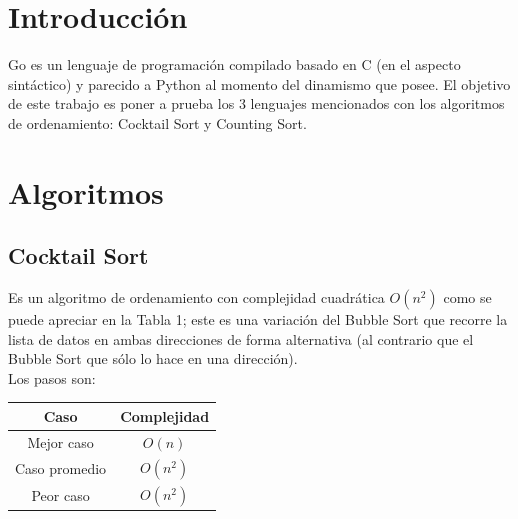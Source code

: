 \documentclass[https://www.overleaf.com/project/63761df255a8a9f4a15c3579
	letterpaper, %
	10pt, %
]{CSUniSchoolLabReport}
\begin{document}


\section{Introducción}

Go es un lenguaje de programación compilado basado en C (en el aspecto sintáctico) y parecido a Python al momento del dinamismo que posee. El objetivo de este trabajo es poner a prueba los 3 lenguajes mencionados con los algoritmos de ordenamiento: Cocktail Sort y Counting Sort.
 

\section{Algoritmos}

\subsection{Cocktail Sort}

Es un algoritmo de ordenamiento con complejidad cuadrática \(O(n^2)\) como se puede apreciar en la Tabla 1; este es una variación del Bubble Sort que recorre la lista de datos en ambas direcciones de forma alternativa (al contrario que el Bubble Sort que sólo lo hace en una dirección). \\
Los pasos son:\\

\begin{center}
    \begin{tabular}{| c | c |}
        \hline
            Caso & Complejidad \\ 
        \hline
            Mejor caso & \(O(n)\) \\
            Caso promedio & \(O(n^2)\) \\
            Peor caso & \(O(n^2)\) \\ 
        \hline
    \end{tabular}
\end{center}
\end{document}
